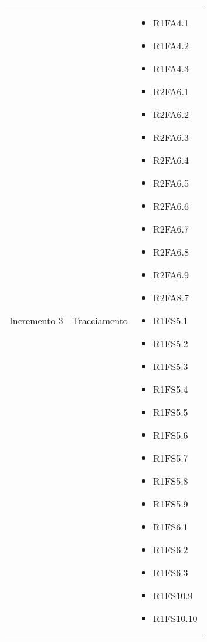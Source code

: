 {\begin{longtable}{C{4cm} C{6cm} C{4cm}}
Incremento 3 & Tracciamento & \begin{itemize}
    \item[ ] R1FA4.1
    \item[ ] R1FA4.2
    \item[ ] R1FA4.3
    \item[ ] R2FA6.1
    \item[ ] R2FA6.2
    \item[ ] R2FA6.3
    \item[ ] R2FA6.4
    \item[ ] R2FA6.5
    \item[ ] R2FA6.6
    \item[ ] R2FA6.7
    \item[ ] R2FA6.8 
    \item[ ] R2FA6.9
    \item[ ] R2FA8.7
    \item[ ] R1FS5.1
    \item[ ] R1FS5.2
    \item[ ] R1FS5.3
    \item[ ] R1FS5.4 
    \item[ ] R1FS5.5
    \item[ ] R1FS5.6
    \item[ ] R1FS5.7 
    \item[ ] R1FS5.8
    \item[ ] R1FS5.9 
    \item[ ] R1FS6.1
    \item[ ] R1FS6.2
    \item[ ] R1FS6.3
    \item[ ] R1FS10.9
    \item[ ] R1FS10.10
\end{itemize}\\


\end{longtable}}
